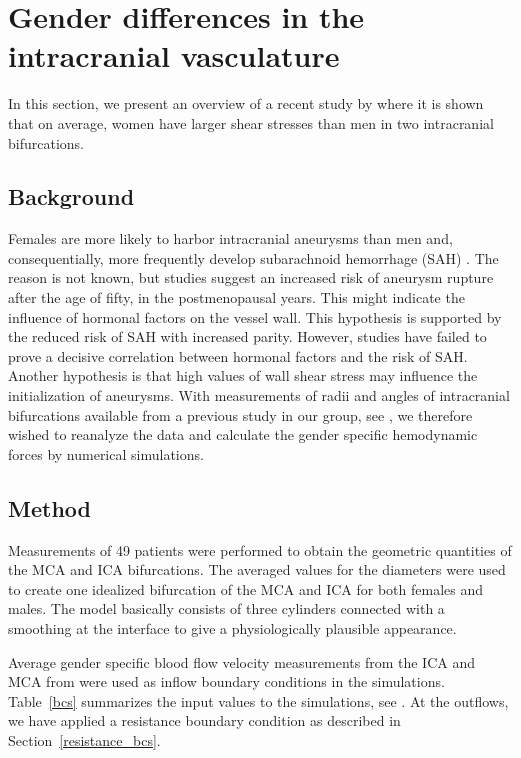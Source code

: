 \section{Gender differences in the intracranial vasculature} \label{gender}

In this section, we present an overview of a recent study
by \citet{LindekleivValen-SendstadMorganEtAl2010} where it is shown
that on average, women have larger shear stresses than men in two
intracranial bifurcations.

\subsection{Background}

Females are more likely to harbor intracranial aneurysms than men and,
consequentially, more frequently develop subarachnoid hemorrhage
(SAH) \citep{EdenMeurerSanchezEtAl2008}. The reason is not known, but
studies suggest an increased risk of aneurysm rupture after the age of
fifty, in the postmenopausal years. This might indicate the influence
of hormonal factors on the vessel wall. This hypothesis is supported
by the reduced risk of SAH with increased parity. However, studies
have failed to prove a decisive correlation between hormonal factors
and the risk of SAH. Another hypothesis is that high values of wall
shear stress may influence the initialization of aneurysms. With
measurements of radii and angles of intracranial bifurcations
available from a previous study in our group,
see \citet{IngebrigtsenMorganFaulderEtAl2004}, we therefore wished to
reanalyze the data and calculate the gender specific hemodynamic
forces by numerical simulations.

\subsection{Method}

Measurements of 49 patients were performed to obtain the geometric
quantities of the MCA and ICA bifurcations. The averaged values for
the diameters were used to create one idealized bifurcation of the MCA
and ICA for both females and males. The model basically consists of
three cylinders connected with a smoothing at the interface to give a
physiologically plausible appearance.

Average gender specific blood flow velocity measurements from the ICA
and MCA from \citet{KrejzaSzydlikLiebeskindEtAl2005} were used as
inflow boundary conditions in the simulations. Table~\ref{bcs}
summarizes the input values to the simulations,
see \citet{LindekleivValen-SendstadMorganEtAl2010}.  At the outflows,
we have applied a resistance boundary condition as described in
Section~\ref{resistance_bcs}.

